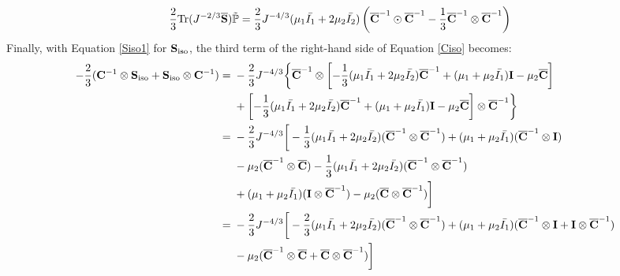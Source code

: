 \begin{equation} \label{part21}
\begin{split}
\frac{2}{3}\mathrm{Tr}(J^{-2/3}\overline{\bold{S}})\tilde{\mathbb{P}}
&= \frac{2}{3}J^{-4/3}(\mu_1\bar{I_1} + 2\mu_2\bar{I_2})\left({\overline{\bold{C}}}^{-1} \odot {{\overline{\bold{C}}}}^{-1} - \frac{1}{3}{{\overline{\bold{C}}}}^{-1} \otimes {\overline{{\bold{C}}}}^{-1}\right)
\end{split}
\end{equation}
Finally, with Equation \ref{Siso1} for $\bold{S}_\mathrm{iso}$, the third term of the right-hand side of Equation \ref{Ciso} becomes:
\begin{equation} \label{part31}
\begin{split}
- \frac{2}{3}(\bold{C}^{-1}\otimes\bold{S}_\mathrm{iso} + \bold{S}_\mathrm{iso}\otimes \bold{C}^{-1})
= {} &
- \frac{2}{3}J^{-4/3} \bigg\{ {\overline{\bold{C}}}^{-1} \otimes \left[-\frac{1}{3}(\mu_1\bar{I_1} + 2\mu_2\bar{I_2}){\overline{\bold{C}}}^{-1} + (\mu_1 + \mu_2\bar{I_1})\bold{I} - \mu_2{\overline{\bold{C}}} \right] \\
&+
\left[-\frac{1}{3}(\mu_1\bar{I_1} + 2\mu_2\bar{I_2}){\overline{\bold{C}}}^{-1} + (\mu_1 + \mu_2\bar{I_1})\bold{I} - \mu_2{\overline{\bold{C}}} \right] \otimes {\overline{\bold{C}}}^{-1} \bigg\} \\
= {} &
- \frac{2}{3}J^{-4/3} \bigg[ -\frac{1}{3}(\mu_1\bar{I_1} + 2\mu_2\bar{I_2}) ({\overline{\bold{C}}}^{-1} \otimes {\overline{\bold{C}}}^{-1}) + (\mu_1 + \mu_2\bar{I_1})({\overline{\bold{C}}}^{-1}\otimes\bold{I}) \\ 
& - \mu_2({\overline{\bold{C}}}^{-1} \otimes {\overline{\bold{C}}}) 
- \frac{1}{3}(\mu_1\bar{I_1} + 2\mu_2\bar{I_2}) ({\overline{\bold{C}}}^{-1} \otimes {\overline{\bold{C}}}^{-1}) \\
&+ (\mu_1 + \mu_2\bar{I_1}) (\bold{I} \otimes {\overline{\bold{C}}}^{-1}) - \mu_2 ({\overline{\bold{C}}} \otimes {\overline{\bold{C}}}^{-1}) \bigg] \\
= {} &
 - \frac{2}{3}J^{-4/3} \bigg[ -\frac{2}{3}(\mu_1\bar{I_1} + 2\mu_2\bar{I_2})({\overline{\bold{C}}}^{-1} \otimes {\overline{\bold{C}}}^{-1}) + (\mu_1+\mu_2\bar{I_1})({\overline{\bold{C}}}^{-1} \otimes \bold{I} + \bold{I} \otimes {\overline{\bold{C}}}^{-1})\\
&- \mu_2({\overline{\bold{C}}}^{-1} \otimes {\overline{\bold{C}}}+{\overline{\bold{C}}} \otimes {\overline{\bold{C}}}^{-1}) \bigg]
\end{split}
\end{equation}

